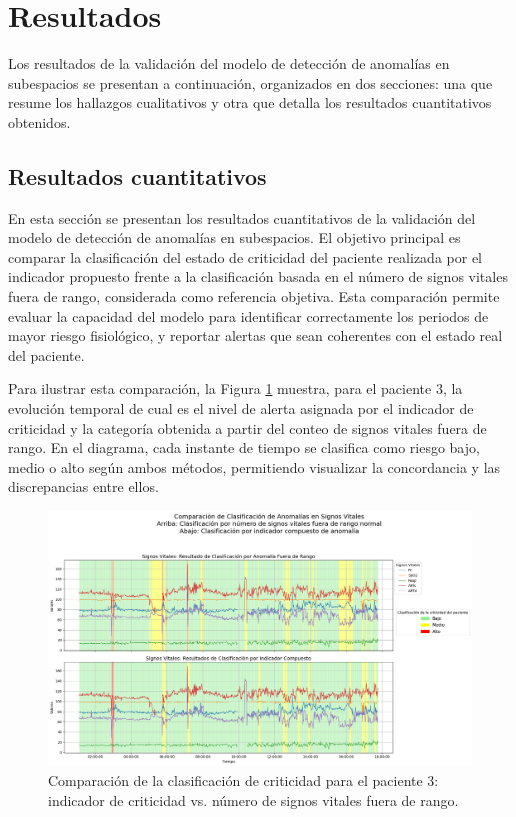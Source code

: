\section{Resultados}

Los resultados de la validación del modelo de detección de anomalías en subespacios se presentan a continuación, organizados en dos secciones: una que resume los hallazgos cualitativos y otra que detalla los resultados cuantitativos obtenidos.

\subsection{Resultados cuantitativos}

En esta sección se presentan los resultados cuantitativos de la validación del modelo de detección de anomalías en subespacios. El objetivo principal es comparar la clasificación del estado de criticidad del paciente realizada por el indicador propuesto frente a la clasificación basada en el número de signos vitales fuera de rango, considerada como referencia objetiva. Esta comparación permite evaluar la capacidad del modelo para identificar correctamente los periodos de mayor riesgo fisiológico, y reportar alertas que sean coherentes con el estado real del paciente.

Para ilustrar esta comparación, la Figura \ref{fig:comparacion_clasificacion_paciente3} muestra, para el paciente 3, la evolución temporal de cual es el nivel de alerta asignada por el indicador de criticidad y la categoría obtenida a partir del conteo de signos vitales fuera de rango. En el diagrama, cada instante de tiempo se clasifica como riesgo bajo, medio o alto según ambos métodos, permitiendo visualizar la concordancia y las discrepancias entre ellos.

\begin{figure}[H]
  \centering
  \includegraphics[width=\textwidth]{Images/comparacion_indicador_con_fuera_de_rango.png}
  \caption{Comparación de la clasificación de criticidad para el paciente 3: indicador de criticidad vs. número de signos vitales fuera de rango.}
  \label{fig:comparacion_clasificacion_paciente3}
\end{figure}

